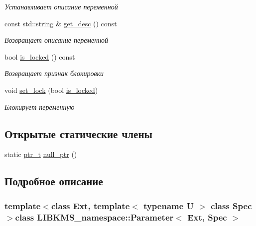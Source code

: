 \begin{DoxyCompactItemize}
\begin{DoxyCompactList}\small\item\em Устанавливает описание переменной \end{DoxyCompactList}\item 
const std\-::string \& \hyperlink{classLIBKMS__namespace_1_1Parameter_a5696d8f34e854cae392e96ecca20e6c0}{get\-\_\-desc} () const 
\begin{DoxyCompactList}\small\item\em Возвращает описание переменной \end{DoxyCompactList}\item 
bool \hyperlink{classLIBKMS__namespace_1_1Parameter_a1bc31e7df8a2b5c68bec3ca3300af114}{is\-\_\-locked} () const 
\begin{DoxyCompactList}\small\item\em Возвращает признак блокировки \end{DoxyCompactList}\item 
void \hyperlink{classLIBKMS__namespace_1_1Parameter_aea87ceb7edf34c23aa5ec9240cd90673}{set\-\_\-lock} (bool \hyperlink{classLIBKMS__namespace_1_1Parameter_a1bc31e7df8a2b5c68bec3ca3300af114}{is\-\_\-locked})
\begin{DoxyCompactList}\small\item\em Блокирует переменную \end{DoxyCompactList}\end{DoxyCompactItemize}
\subsection*{Открытые статические члены}
\begin{DoxyCompactItemize}
\item 
static \hyperlink{classLIBKMS__namespace_1_1Parameter_a28516bcd5bad5857b2d1c676e4176f51}{ptr\-\_\-t} \hyperlink{classLIBKMS__namespace_1_1Parameter_a3978d2027190f56451d37703d7e317a2}{null\-\_\-ptr} ()
\end{DoxyCompactItemize}


\subsection{Подробное описание}
\subsubsection*{template$<$class Ext, template$<$ typename U $>$ class Spec$>$class L\-I\-B\-K\-M\-S\-\_\-namespace\-::\-Parameter$<$ Ext, Spec $>$}

